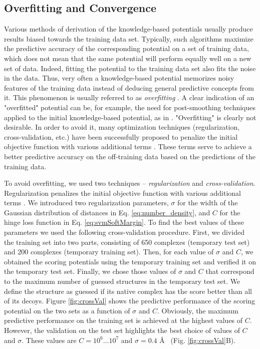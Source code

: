 \subsection{Overfitting and Convergence}
\label{parametersDerivation}
Various methods of derivation of the knowledge-based potentials usually produce results biased towards the training data set. 
Typically, such algorithms maximize the predictive accuracy of the corresponding potential on a set of training data, 
which does not mean that the same potential will perform equally well on a new set of data. 
Indeed, fitting the potential to the training data set also fits the noise in the data. Thus, very often a knowledge-based potential memorizes noisy features 
of the training data instead of deducing general predictive concepts from it.
This phenomenon is usually referred 
to as {\em overfitting} \cite{Dietterich1995}.
%
A clear indication of an "overfitted" potential can be, for example, the need for post-smoothing techniques applied to the initial knowledge-based potential, 
as in \cite{Huang2008, mitchell1999bleep}.
"Overfitting" is clearly not desirable. In order to avoid it, many optimization techniques (regularization, cross-validation, etc.) 
have been successfully proposed to penalize the initial objective function with various additional terms \cite{Arlot2010, Kearns1997}. 
These  terms serve to achieve a better predictive accuracy on the off-training data based on the predictions of the training data.

To avoid overfitting, we used two techniques -- {\em regularization} and {\em cross-validation}. 
Regularization penalizes the initial objective function with various additional terms \cite{Arlot2010, Kearns1997}. 
We introduced two regularization parameters, $\sigma$ for the width of the Gaussian distribution of distances in Eq. \ref{eq:number_density}, and  $C$ for the 
hinge loss function in Eq. \ref{eq:svmSoftMargin}. 
%
%
To find the best values of these parameters we used the following cross-validation procedure.
First, we divided the training set into two parts, consisting of 650 complexes (temporary test set) and 200 complexes (temporary training set). 
Then, for each value of $\sigma$ and $C$, we obtained the scoring potentials using the temporary training set and verified it on the temporary test set.
Finally, we chose those values of $\sigma$ and $C$ that correspond to the maximum number of guessed structures in the temporary test set. 
We define the structure as guessed if its native complex has the score better than all of its decoys.	
Figure \ref{fig:crossVal} shows 
the predictive performance of the scoring potential on the two sets as a function of $\sigma$ and $C$. 
Obviously, the maximum predictive performance on the training set is achieved at the highest values of $C$. 
However, the validation on the test set highlights 
the best choice of values of $C$ and $\sigma$.
%
These values are $C=10^6\dots10^7$ and $\sigma=0.4$ \AA~ (Fig. \ref{fig:crossVal}B).

